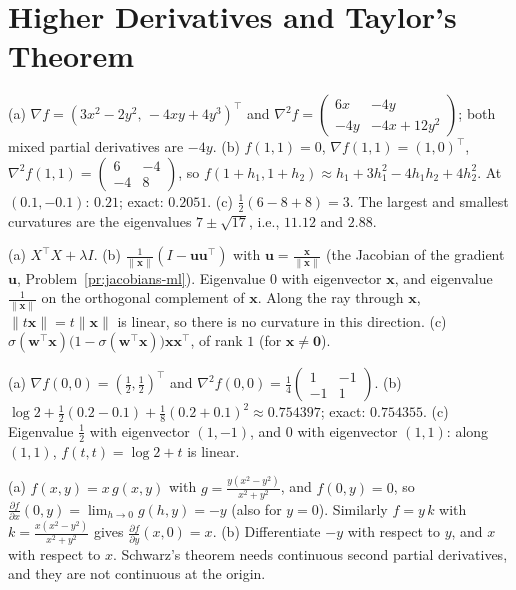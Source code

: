 \documentclass[11pt]{article}
\newcommand{\norm}[1]{\lVert #1 \rVert}
\begin{document}
\section*{Higher Derivatives and Taylor's Theorem}

\begin{description}[leftmargin=0pt, itemsep=0.3em]
    \item[\ref{pr:hessian-compute}.] (a) $\nabla f = (3x^2 - 2y^2, \, -4xy + 4y^3)^\top$ and $\nabla^2 f = \begin{pmatrix} 6x & -4y \\ -4y & -4x + 12y^2 \end{pmatrix}$; both mixed partial derivatives are $-4y$. (b) $f(1, 1) = 0$, $\nabla f(1, 1) = (1, 0)^\top$, $\nabla^2 f(1, 1) = \begin{pmatrix} 6 & -4 \\ -4 & 8 \end{pmatrix}$, so $f(1 + h_1, 1 + h_2) \approx h_1 + 3h_1^2 - 4h_1h_2 + 4h_2^2$. At $(0.1, -0.1)$: $0.21$; exact: $0.2051$. (c) $\frac{1}{2}(6 - 8 + 8) = 3$. The largest and smallest curvatures are the eigenvalues $7 \pm \sqrt{17}$, i.e., $11.12$ and $2.88$.
    \item[\ref{pr:hessians-ml}.] (a) $X^\top X + \lambda I$. (b) $\frac{1}{\norm{\mathbf{x}}}(I - \mathbf{u}\mathbf{u}^\top)$ with $\mathbf{u} = \frac{\mathbf{x}}{\norm{\mathbf{x}}}$ (the Jacobian of the gradient $\mathbf{u}$, Problem~\ref{pr:jacobians-ml}). Eigenvalue $0$ with eigenvector $\mathbf{x}$, and eigenvalue $\frac{1}{\norm{\mathbf{x}}}$ on the orthogonal complement of $\mathbf{x}$. Along the ray through $\mathbf{x}$, $\norm{t\mathbf{x}} = t\norm{\mathbf{x}}$ is linear, so there is no curvature in this direction. (c) $\sigma(\mathbf{w}^\top\mathbf{x})\big(1 - \sigma(\mathbf{w}^\top\mathbf{x})\big)\mathbf{x}\mathbf{x}^\top$, of rank $1$ (for $\mathbf{x} \neq \mathbf{0}$).
    \item[\ref{pr:lse-taylor}.] (a) $\nabla f(0, 0) = (\frac{1}{2}, \frac{1}{2})^\top$ and $\nabla^2 f(0, 0) = \frac{1}{4}\begin{pmatrix} 1 & -1 \\ -1 & 1 \end{pmatrix}$. (b) $\log 2 + \frac{1}{2}(0.2 - 0.1) + \frac{1}{8}(0.2 + 0.1)^2 \approx 0.754397$; exact: $0.754355$. (c) Eigenvalue $\frac{1}{2}$ with eigenvector $(1, -1)$, and $0$ with eigenvector $(1, 1)$: along $(1, 1)$, $f(t, t) = \log 2 + t$ is linear.
    \item[\ref{pr:schwarz-counterexample}.] (a) $f(x, y) = x\,g(x, y)$ with $g = \frac{y(x^2 - y^2)}{x^2 + y^2}$, and $f(0, y) = 0$, so $\frac{\partial f}{\partial x}(0, y) = \lim_{h \to 0}g(h, y) = -y$ (also for $y = 0$). Similarly $f = y\,k$ with $k = \frac{x(x^2 - y^2)}{x^2 + y^2}$ gives $\frac{\partial f}{\partial y}(x, 0) = x$. (b) Differentiate $-y$ with respect to $y$, and $x$ with respect to $x$. Schwarz's theorem needs continuous second partial derivatives, and they are not continuous at the origin.

\end{description}
\end{document}
